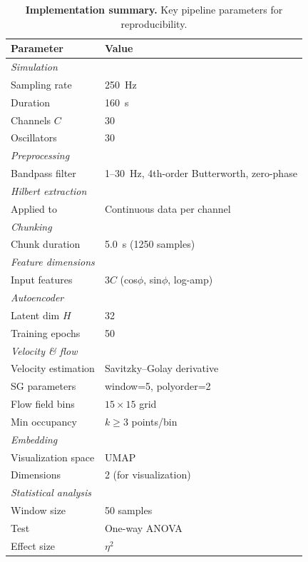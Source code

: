 \documentclass[5p,twocolumn,authoryear]{elsarticle}
\begin{document}
\begin{table}[h]
\centering
\caption{\textbf{Implementation summary.} Key pipeline parameters for reproducibility.}
\label{tab:implementation_summary}
\begin{tabular}{ll}
\toprule
\textbf{Parameter} & \textbf{Value} \\
\midrule
\multicolumn{2}{l}{\emph{Simulation}} \\
Sampling rate & 250~Hz \\
Duration & 160~s \\
Channels $C$ & 30 \\
Oscillators & 30 \\
\midrule
\multicolumn{2}{l}{\emph{Preprocessing}} \\
Bandpass filter & 1--30~Hz, 4th-order Butterworth, zero-phase \\
\midrule
\multicolumn{2}{l}{\emph{Hilbert extraction}} \\
Applied to & Continuous data per channel \\
\midrule
\multicolumn{2}{l}{\emph{Chunking}} \\
Chunk duration & 5.0~s (1250 samples) \\
\midrule
\multicolumn{2}{l}{\emph{Feature dimensions}} \\
Input features & $3C$ (cos$\phi$, sin$\phi$, log-amp) \\
\midrule
\multicolumn{2}{l}{\emph{Autoencoder}} \\
Latent dim $H$ & 32 \\
Training epochs & 50 \\
\midrule
\multicolumn{2}{l}{\emph{Velocity \& flow}} \\
Velocity estimation & Savitzky--Golay derivative \\
SG parameters & window=5, polyorder=2 \\
Flow field bins & $15 \times 15$ grid \\
Min occupancy & $k \geq 3$ points/bin \\
\midrule
\multicolumn{2}{l}{\emph{Embedding}} \\
Visualization space & UMAP \\
Dimensions & 2 (for visualization) \\
\midrule
\multicolumn{2}{l}{\emph{Statistical analysis}} \\
Window size & 50 samples \\
Test & One-way ANOVA \\
Effect size & $\eta^2$ \\
\bottomrule
\end{tabular}
\end{table}
\end{document}
